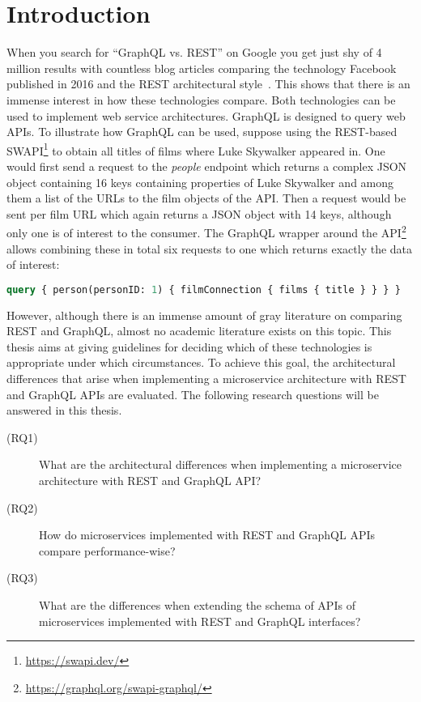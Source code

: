 \section{Introduction}\label{sec:introduction}

When you search for ``GraphQL vs. \acs{REST}'' on Google you get just shy of 4 million results with countless blog articles comparing the technology Facebook published in 2016 and the \acf{REST} architectural style~\cite{Brito2019}.
This shows that there is an immense interest in how these technologies compare.
Both technologies can be used to implement web service architectures.
GraphQL is designed to query web \acp{API}.
To illustrate how GraphQL can be used, suppose using the \ac{REST}-based \ac{SWAPI}\footnote{\url{https://swapi.dev/}} to obtain all titles of films where Luke Skywalker appeared in.
One would first send a request to the \textit{people} endpoint which returns a complex \ac{JSON} object containing 16 keys containing properties of Luke Skywalker and among them a list of the \acp{URL} to the film objects of the \ac{API}.
Then a request would be sent per film \ac{URL} which again returns a \ac{JSON} object with 14 keys, although only one is of interest to the consumer.
The GraphQL wrapper around the \ac{API}\footnote{\url{https://graphql.org/swapi-graphql/}} allows combining these in total six requests to one which returns exactly the data of interest:
\begin{lstlisting}[language=graphql]
query { person(personID: 1) { filmConnection { films { title } } } }
\end{lstlisting}



However, although there is an immense amount of gray literature on comparing \ac{REST} and GraphQL, almost no academic literature exists on this topic.
This thesis aims at giving guidelines for deciding which of these technologies is appropriate under which circumstances.
To achieve this goal, the architectural differences that arise when implementing a microservice architecture with \ac{REST} and GraphQL \acp{API} are evaluated.
The following research questions will be answered in this thesis.

\begin{description}
    \item[(RQ1)] What are the architectural differences when implementing a microservice architecture with \ac{REST} and GraphQL \ac{API}?
    \item[(RQ2)] How do microservices implemented with \ac{REST} and GraphQL \acp{API} compare performance-wise?
    \item[(RQ3)] What are the differences when extending the schema of \acp{API} of microservices implemented with \ac{REST} and GraphQL interfaces?  
\end{description}

